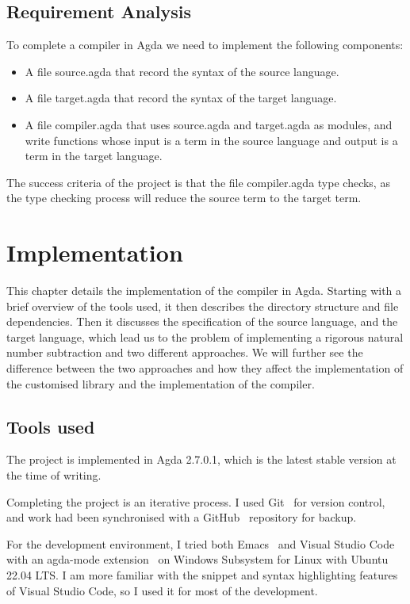 \documentclass[12pt,twoside,a4paper]{report}
\theoremstyle{definition}
\theoremstyle{definition}
\theoremstyle{definition}
\theoremstyle{definition}
\begin{document}
    \section{Requirement Analysis}
    To complete a compiler in Agda we need to implement the following components:
    \begin{itemize}
        \item 
            A file source.agda that record the syntax of the source language.

        \item
            A file target.agda that record the syntax of the target language.

        \item
            A file compiler.agda that uses source.agda and target.agda as modules, and write functions whose input is a term in the source language and output is a term in the target language.
    \end{itemize}
    The success criteria of the project is that the file compiler.agda type checks, as the type checking process will reduce the source term to the target term.

\chapter{Implementation} \label{chap: implementation}
    \minitoc
    This chapter details the implementation of the compiler in Agda. Starting with a brief overview of the tools used, it then describes the directory structure and file dependencies. Then it discusses the specification of the source language, and the target language, which lead us to the problem of implementing a rigorous natural number subtraction and two different approaches. We will further see the difference between the two approaches and how they affect the implementation of the customised library and the implementation of the compiler. 
    

    \section{Tools used}
    The project is implemented in Agda 2.7.0.1, which is the latest stable version at the time of writing.

    Completing the project is an iterative process. I used Git~\cite{git} for version control, and work had been synchronised with a GitHub~\cite{github} repository for backup.

    For the development environment, I tried both Emacs~\cite{emacs} and Visual Studio Code~\cite{vscode} with an agda-mode extension~\cite{agda_mode} on Windows Subsystem for Linux with Ubuntu~\cite{wsl_ubuntu} 22.04 LTS. I am more familiar with the snippet and syntax highlighting features of Visual Studio Code, so I used it for most of the development. 
\end{document}
